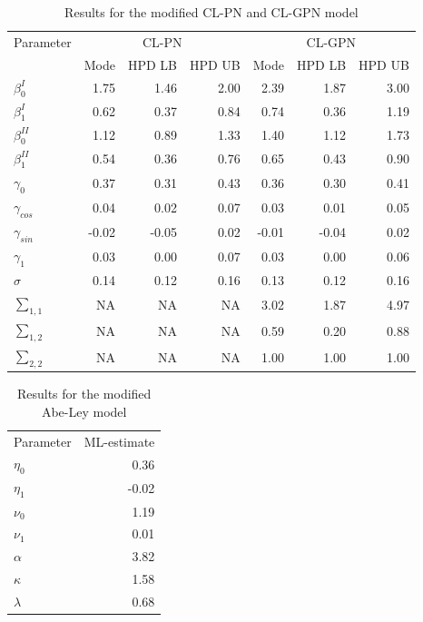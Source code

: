 \documentclass[11pt,]{article}
\begin{document}
\begin{table}

\caption{\label{tab:estCLGPN}Results for the modified CL-PN and CL-GPN model}
\centering
\begin{tabular}[t]{lrrrrrr}
\toprule
\multicolumn{1}{c}{Parameter} & \multicolumn{3}{c}{CL-PN} & \multicolumn{3}{c}{CL-GPN} \\
\cmidrule(l{2pt}r{2pt}){1-1} \cmidrule(l{2pt}r{2pt}){2-4} \cmidrule(l{2pt}r{2pt}){5-7}
  & Mode & HPD LB & HPD UB & Mode & HPD LB & HPD UB\\
\midrule
$\beta_0^{I}$ & 1.75 & 1.46 & 2.00 & 2.39 & 1.87 & 3.00\\
$\beta_1^{I}$ & 0.62 & 0.37 & 0.84 & 0.74 & 0.36 & 1.19\\
$\beta_0^{II}$ & 1.12 & 0.89 & 1.33 & 1.40 & 1.12 & 1.73\\
$\beta_1^{II}$ & 0.54 & 0.36 & 0.76 & 0.65 & 0.43 & 0.90\\
$\gamma_0$ & 0.37 & 0.31 & 0.43 & 0.36 & 0.30 & 0.41\\
\addlinespace
$\gamma_{cos}$ & 0.04 & 0.02 & 0.07 & 0.03 & 0.01 & 0.05\\
$\gamma_{sin}$ & -0.02 & -0.05 & 0.02 & -0.01 & -0.04 & 0.02\\
$\gamma_1$ & 0.03 & 0.00 & 0.07 & 0.03 & 0.00 & 0.06\\
$\sigma$ & 0.14 & 0.12 & 0.16 & 0.13 & 0.12 & 0.16\\
$\sum_{1,1}$ & NA & NA & NA & 3.02 & 1.87 & 4.97\\
\addlinespace
$\sum_{1,2}$ & NA & NA & NA & 0.59 & 0.20 & 0.88\\
$\sum_{2,2}$ & NA & NA & NA & 1.00 & 1.00 & 1.00\\
\bottomrule
\end{tabular}
\end{table}

\begin{table}

\caption{\label{tab:estSL}Results for the modified Abe-Ley model}
\centering
\begin{tabular}[t]{lr}
\toprule
\multicolumn{1}{c}{Parameter} & \multicolumn{1}{c}{ML-estimate} \\
\cmidrule(l{2pt}r{2pt}){1-1} \cmidrule(l{2pt}r{2pt}){2-2}
$\eta_0$ & 0.36\\
$\eta_1$ & -0.02\\
$\nu_0$ & 1.19\\
$\nu_1$ & 0.01\\
$\alpha$ & 3.82\\
\addlinespace
$\kappa$ & 1.58\\
$\lambda$ & 0.68\\
\bottomrule
\end{tabular}
\end{table}
\end{document}
